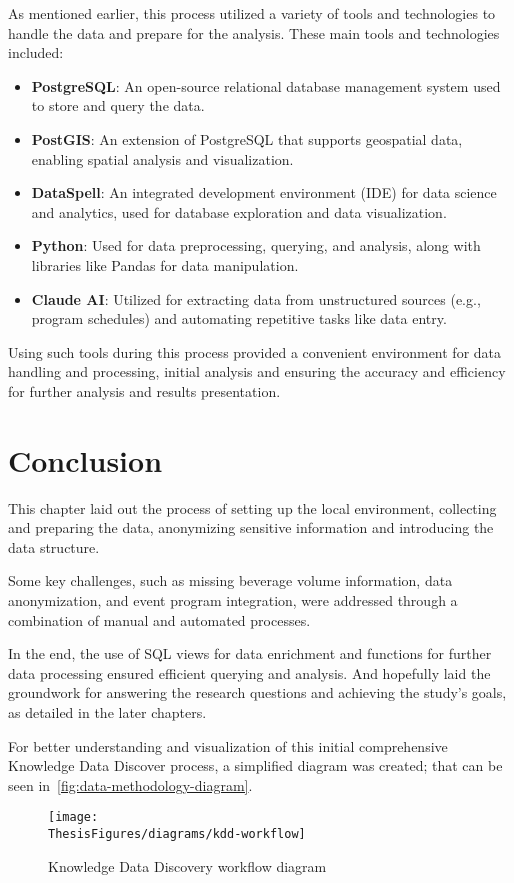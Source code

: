 As mentioned earlier, this process utilized a variety of tools and technologies to handle the data and prepare for the analysis.
These main tools and technologies included:
\begin{itemize}
	\item \textbf{PostgreSQL}: An open-source relational database management system used to store and query the data.
	\item \textbf{PostGIS}: An extension of PostgreSQL that supports geospatial data, enabling spatial analysis and visualization.
	\item \textbf{DataSpell}: An integrated development environment (IDE) for data science and analytics, used for database exploration and data visualization.
	\item \textbf{Python}: Used for data preprocessing, querying, and analysis, along with libraries like Pandas for data manipulation.
	\item \textbf{Claude AI}: Utilized for extracting data from unstructured sources (e.g., program schedules) and automating repetitive tasks like data entry.
\end{itemize}

Using such tools during this process provided a convenient environment for data handling and processing, initial analysis and ensuring the accuracy and efficiency for further analysis and results presentation.


\section{Conclusion}
\label{sec:data-methodology-conclusion}
This chapter laid out the process of setting up the local environment, collecting and preparing the data, anonymizing sensitive information and introducing the data structure.

Some key challenges, such as missing beverage volume information, data anonymization, and event program integration, were addressed through a combination of manual and automated processes.

In the end, the use of SQL views for data enrichment and functions for further data processing ensured efficient querying and analysis.
And hopefully laid the groundwork for answering the research questions and achieving the study's goals, as detailed in the later chapters.

For better understanding and visualization of this initial comprehensive Knowledge Data Discover process, a simplified diagram was created; that can be seen in~\autoref{fig:data-methodology-diagram}.

\begin{figure}[H]
	\centering
	\texttt{[image: \\ThesisFigures/diagrams/kdd-workflow]}
	\caption{Knowledge Data Discovery workflow diagram}
	\label{fig:data-methodology-diagram}
\end{figure}
